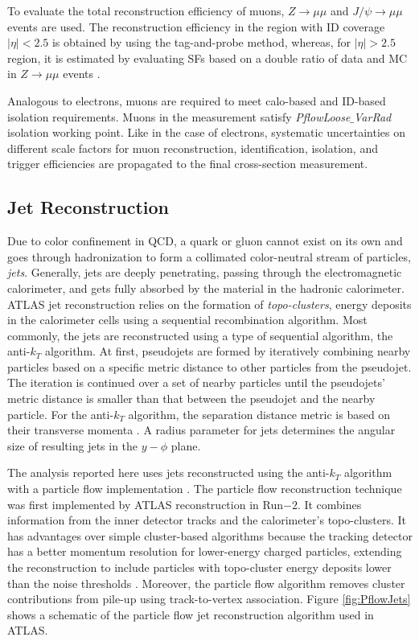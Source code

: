 To evaluate the total reconstruction efficiency of muons, $Z \rightarrow \mu\mu$ and $J/\psi \rightarrow \mu\mu$ events are used. The reconstruction efficiency in the region with ID coverage $|\eta|<2.5$ is obtained by using the tag-and-probe method, whereas, for $|\eta|>2.5$ region, it is estimated by evaluating SFs based on a double ratio of data and MC in $Z \rightarrow \mu\mu$ events \cite{MuonEffLargeEta}.

Analogous to electrons, muons are required to meet calo-based and ID-based isolation requirements. Muons in the measurement satisfy \textit{PflowLoose$\_$VarRad} isolation working point. Like in the case of electrons, systematic uncertainties on different scale factors for muon reconstruction, identification, isolation, and trigger efficiencies are propagated to the final cross-section measurement.

\subsection{Jet Reconstruction}
\label{subsec:ParticleRecon_Jets}

Due to color confinement in QCD, a quark or gluon cannot exist on its own and goes through hadronization to form a collimated color-neutral stream of particles, \textit{jets}. Generally, jets are deeply penetrating, passing through the electromagnetic calorimeter, and gets fully absorbed by the material in the hadronic calorimeter. ATLAS jet reconstruction relies on the formation of \textit{topo-clusters}, energy deposits in the calorimeter cells using a sequential recombination algorithm. Most commonly, the jets are reconstructed using a type of sequential algorithm, the anti-$k_{T}$ algorithm. At first, pseudojets are formed by iteratively combining nearby particles based on a specific metric distance to other particles from the pseudojet. The iteration is continued over a set of nearby particles until the pseudojets' metric distance is smaller than that between the pseudojet and the nearby particle. For the anti-$k_{T}$ algorithm, the separation distance metric is based on their transverse momenta \cite{AntiKtAlgo}. A radius parameter for jets determines the angular size of resulting jets in the $y-\phi$ plane. 

The analysis reported here uses jets reconstructed using the anti-$k_{T}$ algorithm with a particle flow implementation \cite{ParticleFlow}\cite{AntiKtAlgo}. The particle flow reconstruction technique was first implemented by ATLAS reconstruction in Run$-2$. It combines information from the inner detector tracks and the calorimeter's topo-clusters. It has advantages over simple cluster-based algorithms because the tracking detector has a better momentum resolution for lower-energy charged particles, extending the reconstruction to include particles with topo-cluster energy deposits lower than the noise thresholds \cite{ParticleFlow}. Moreover, the particle flow algorithm removes cluster contributions from pile-up using track-to-vertex association. Figure \ref{fig:PflowJets} shows a schematic of the particle flow jet reconstruction algorithm used in ATLAS.

